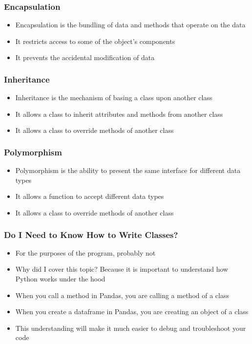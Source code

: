 \documentclass[serif, 9pt, aspectratio=32]{beamer}
\begin{document}
\begin{frame}
    \centering
    \frametitle{Encapsulation}
    \begin{itemize}
        \setlength{\itemsep}{2em}
        \item Encapsulation is the bundling of data and methods that operate on the data
        \item It restricts access to some of the object's components
        \item It prevents the accidental modification of data
    \end{itemize}
\end{frame}

\begin{frame}
    \centering
    \frametitle{Inheritance}
    \begin{itemize}
        \setlength{\itemsep}{2em}
        \item Inheritance is the mechanism of basing a class upon another class
        \item It allows a class to inherit attributes and methods from another class
        \item It allows a class to override methods of another class
    \end{itemize}
\end{frame}

\begin{frame}
    \centering
    \frametitle{Polymorphism}
    \begin{itemize}
        \setlength{\itemsep}{2em}
        \item Polymorphism is the ability to present the same interface for different data types
        \item It allows a function to accept different data types
        \item It allows a class to override methods of another class
    \end{itemize}
\end{frame}

\begin{frame}
    \centering
    \frametitle{Do I Need to Know How to Write Classes?}
    \begin{itemize}
        \setlength{\itemsep}{2em}
        \item For the purposes of the program, probably not
        \item Why did I cover this topic? Because it is important to understand how Python works under the hood
        \item When you call a method in Pandas, you are calling a method of a class
        \item When you create a dataframe in Pandas, you are creating an object of a class
        \item This understanding will make it much easier to debug and troubleshoot your code
    \end{itemize}
\end{frame}
\end{document}
